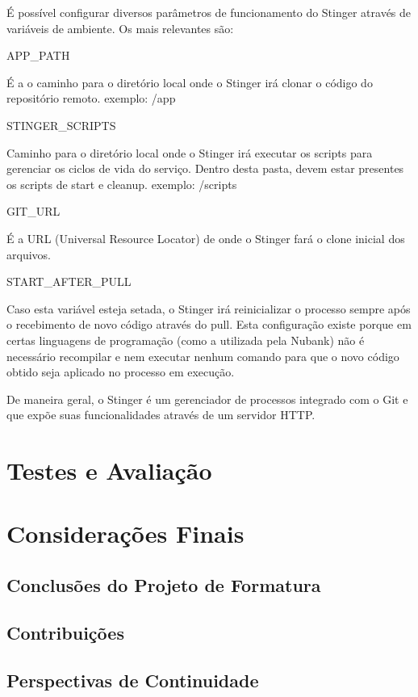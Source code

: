 \documentclass[]{politex}
\begin{document}
	É possível configurar diversos parâmetros de funcionamento do Stinger através de variáveis de ambiente. Os mais relevantes são:
	
	APP\_PATH
	
	É a o caminho para o diretório local onde o Stinger irá clonar o código do repositório remoto.
	exemplo: /app


	STINGER\_SCRIPTS
	
	Caminho para o diretório local onde o Stinger irá executar os scripts para gerenciar os ciclos de vida do serviço. Dentro desta pasta, devem estar presentes os scripts de start e cleanup.
	exemplo: /scripts
	
	GIT\_URL
	
	É a URL (Universal Resource Locator) de onde o Stinger fará o clone inicial dos arquivos.
	
	START\_AFTER\_PULL
	
	Caso esta variável esteja setada, o Stinger irá reinicializar o processo sempre após o recebimento de novo código através do pull. Esta configuração existe porque em certas linguagens de programação (como a utilizada pela Nubank) não é necessário recompilar e nem executar nenhum comando para que o novo código obtido seja aplicado no processo em execução.
    
	De maneira geral, o Stinger é um gerenciador de processos integrado com o Git e que expõe suas funcionalidades através de um servidor HTTP.

\chapter{Testes e Avaliação}
\chapter{Considerações Finais}
	\section{Conclusões do Projeto de Formatura}
	\section{Contribuições}
	\section{Perspectivas de Continuidade}
	

\end{document}
